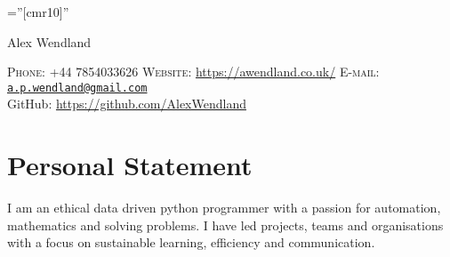 \documentclass[a4paper,10pt]{article}
\begin{document}
\pagestyle{empty} %

\font\fb=''[cmr10]'' %

\par{\centering
		{\Huge Alex Wendland
	}\bigskip\par}
\vspace{-0.3 cm}
\begin{center}
	\textsc{Phone:} +44 7854033626 \hspace{1cm} \textsc{Website:} \href{https://awendland.co.uk/}{https://awendland.co.uk/} \hspace{1cm} \textsc{E-mail:} \href{mailto:a.p.wendland@gmail.com}{\texttt{a.p.wendland@gmail.com}}\\
	GitHub: \href{https://github.com/AlexWendland}{https://github.com/AlexWendland}
\end{center}

\section{Personal Statement}
I am an ethical data driven python programmer with a passion for automation,
mathematics and solving problems. I have led projects, teams and organisations
with a focus on sustainable learning, efficiency and communication.
\end{document}
